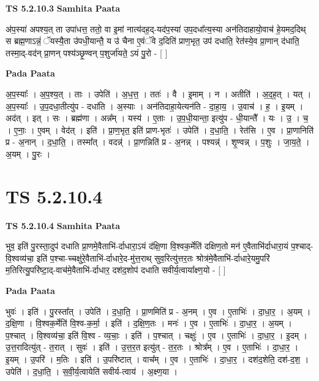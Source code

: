 \documentclass[17pt]{extarticle}
\begin{document}
\textbf{TS 5.2.10.3 } \newline
\textbf{Samhita Paata} \newline

अ॑प॒स्या॑ अपश्य॒त् ता उपा॑धत्त॒ ततो॒ वा इ॒मां नात्य॑दह॒द्-यद॑प॒स्या॑ उप॒दधा᳚त्य॒स्या अन॑तिदाहायो॒वाच॑ हे॒यमद॒दिथ् स ब्रह्म॒णाऽन्नं॒ ॅयस्यै॒ता उ॑पधी॒यान्तै॒ य उ॑ चैना ए॒वंॅवे द॒दिति॑ प्राण॒भृत॒ उप॑ दधाति॒ रेत॑स्ये॒व प्रा॒णान् द॑धाति॒ तस्मा॒द्-वद॑न् प्रा॒णन् पश्य॑ञ्छृ॒ण्वन् प॒शुर्जा॑यते॒ ऽयं पु॒रो - [  ] \newline

\textbf{Pada Paata} \newline

अ॒प॒स्याः᳚ । अ॒प॒श्य॒त् । ताः । उपेति॑ । अ॒ध॒त्त॒ । ततः॑ । वै । इ॒माम् । न । अतीति॑ । अ॒द॒ह॒त् । यत् । अ॒प॒स्याः᳚ । उ॒प॒दधा॒तीत्यु॑प - दधा॑ति । अ॒स्याः । अन॑तिदाहा॒येत्यन॑ति - दा॒हा॒य॒ । उ॒वाच॑ । ह॒ । इ॒यम् । अद॑त् । इत् । सः । ब्रह्म॑णा । अन्न᳚म् । यस्य॑ । ए॒ताः । उ॒प॒धी॒यान्ता॒ इत्यु॑प - धी॒यान्तै᳚ । यः । उ॒ । च॒ । ए॒नाः॒ । ए॒वम् । वेद॑त् । इति॑ । प्रा॒ण॒भृत॒ इति॑ प्राण-भृतः॑ । उपेति॑ । द॒धा॒ति॒ । रेत॑सि । ए॒व । प्रा॒णानिति॑ प्र - अ॒नान् । द॒धा॒ति॒ । तस्मा᳚त् । वदन्न्॑ । प्रा॒णन्निति॑ प्र - अ॒नन्न् । पश्यन्न्॑ । शृ॒ण्वन्न् । प॒शुः । जा॒य॒ते॒ । अ॒यम् । पु॒रः ।  \newline




\section*{ TS 5.2.10.4 }

\textbf{TS 5.2.10.4 } \newline
\textbf{Samhita Paata} \newline

भुव॒ इति॑ पु॒रस्ता॒दुप॑ दधाति प्रा॒णमे॒वैताभि॑-र्दाधारा॒ऽयं द॑क्षि॒णा वि॒श्वक॒र्मेति॑ दक्षिण॒तो मन॑ ए॒वैताभि॑र्दाधारा॒यं प॒श्चाद्-वि॒श्वव्य॑चा॒ इति॑ प॒श्चा-च्चक्षु॑रे॒वैताभि॑-र्दाधारे॒द-मु॑त्त॒राथ् सुव॒रित्यु॑त्तर॒तः श्रोत्र॑मे॒वैताभि॑-र्दाधारे॒यमु॒परि॑ म॒तिरित्यु॒परि॑ष्टा॒द्-वाच॑मे॒वैताभि॑-र्दाधार॒ दश॑द॒शोप॑ दधाति सवीर्य॒त्वाया᳚क्ष्ण॒यो - [  ] \newline

\textbf{Pada Paata} \newline

भुवः॑ । इति॑ । पु॒रस्ता᳚त् । उपेति॑ । द॒धा॒ति॒ । प्रा॒णमिति॑ प्र - अ॒नम् । ए॒व । ए॒ताभिः॑ । दा॒धा॒र॒ । अ॒यम् । द॒क्षि॒णा । वि॒श्वक॒र्मेति॑ वि॒श्व-क॒र्मा॒ । इति॑ । द॒क्षि॒ण॒तः । मनः॑ । ए॒व । ए॒ताभिः॑ । दा॒धा॒र॒ । अ॒यम् । प॒श्चात् । वि॒श्वव्य॑चा॒ इति॑ वि॒श्व - व्य॒चाः॒ । इति॑ । प॒श्चात् । चक्षुः॑ । ए॒व । ए॒ताभिः॑ । दा॒धा॒र॒ । इ॒दम् । उ॒त्त॒रादित्यु॑त् - त॒रात् । सुवः॑ । इति॑ । उ॒त्त॒र॒त इत्यु॑त् - त॒र॒तः । श्रोत्र᳚म् । ए॒व । ए॒ताभिः॑ । दा॒धा॒र॒ । इ॒यम् । उ॒परि॑ । म॒तिः । इति॑ । उ॒परि॑ष्टात् । वाच᳚म् । ए॒व । ए॒ताभिः॑ । दा॒धा॒र॒ । दश॑द॒शेति॒ दश॑-द॒श॒ । उपेति॑ । द॒धा॒ति॒ । स॒वी॒र्य॒त्वायेति॑ सवीर्य-त्वाय॑ । अ॒क्ष्ण॒या ।  \newline
\end{document}

